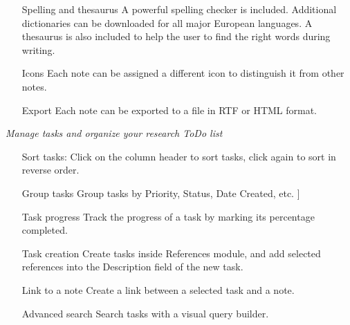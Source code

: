 \begin{itemize}
 \item[Spelling and thesaurus] A powerful spelling checker is included.
 Additional dictionaries can be downloaded for all major European
 languages. A thesaurus is also included to help the user to find the
 right words during writing.

 \item[Icons] Each note can be assigned a different icon to distinguish it
 from other notes.

 \item[Export] Each note can be exported to a file in RTF or HTML format.

\end{itemize}

\textit{Manage tasks and organize your research ToDo list}
\begin{itemize}

 \item[Sort tasks:]Click on the column header to sort tasks, click again to
 sort in reverse order.

\item[Group tasks] Group tasks by Priority, Status, Date Created, etc.
]
 \item[Task progress] Track the progress of a task by marking its
 percentage completed.

 \item[Task creation] Create tasks inside References module, and add
 selected references into the Description field of the new task.

 \item[Link to a note] Create a link between a selected task and a note.

 \item[Advanced search] Search tasks with a visual query builder.

\end{itemize}

